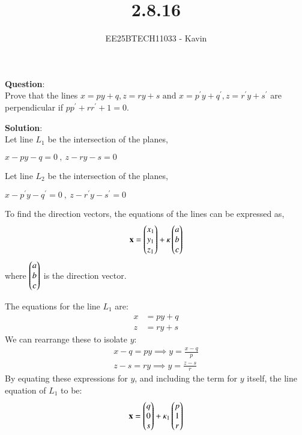 \documentclass[journal]{IEEEtran}
\begin{document}

\vspace{3cm}

\title{2.8.16}
\author{EE25BTECH11033 - Kavin}
{\let\newpage\relax\maketitle}

\renewcommand{\thefigure}{\theenumi}
\renewcommand{\thetable}{\theenumi}
\setlength{\intextsep}{10pt} %
\textbf{Question}:\\
Prove that the lines $x=py+q , z=ry+s \text{ and } x=p^{\prime}y+q^{\prime}, z=r^{\prime}y+s^{\prime} $ are perpendicular if $pp^{\prime}+rr^{\prime}+1=0$.\\
\bigskip

\textbf{Solution}:\\
Let line $L_1$ be the intersection of the planes,
\begin{center}
    $x-py-q=0\ ,\ z-ry-s=0$
\end{center}
Let line $L_2$ be the intersection of the planes,
\begin{center}
    $x-p^{\prime}y-q^{\prime}=0\ ,\ z-r^{\prime}y-s^{\prime}=0$
\end{center}
\bigskip
To find the direction vectors, the equations of the lines can be expressed as,
\begin{align}
	\vec{x} = \myvec{x_1 \\ y_1 \\ z_1} + \kappa \myvec{a \\ b \\ c}
\end{align}
where $\myvec{a\\b\\c}$ is the direction vector.\\
\bigskip

The equations for the line $L_1$ are:
\begin{align}
    x &= py + q \\
    z &= ry + s
\end{align}
We can rearrange these to isolate $y$:
\begin{align}
    x - q = py \implies y = \frac{x-q}{p} \\
    z - s = ry \implies y = \frac{z-s}{r}
\end{align}
By equating these expressions for $y$, and including the term for $y$ itself, the line equation of $L_1$ to be:
\begin{align}
	\vec{x} = \myvec{q \\ 0 \\ s} + \kappa_1 \myvec{p \\ 1 \\ r}
\end{align}\
\end{document}
